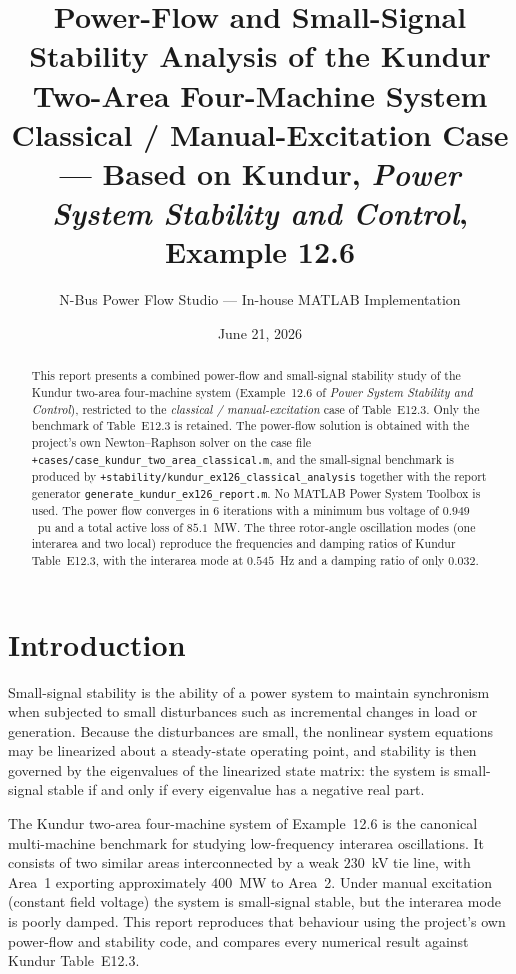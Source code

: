 \documentclass[12pt,a4paper]{article}
\title{\textbf{Power-Flow and Small-Signal Stability Analysis of the
Kundur Two-Area Four-Machine System}\\
\large Classical / Manual-Excitation Case --- Based on Kundur,
\textit{Power System Stability and Control}, Example 12.6}
\author{N-Bus Power Flow Studio --- In-house MATLAB Implementation}
\date{June 21, 2026}
\begin{document}
\maketitle
\thispagestyle{empty}

\begin{abstract}
This report presents a combined power-flow and small-signal stability study of
the Kundur two-area four-machine system (Example~12.6 of
\textit{Power System Stability and Control}), restricted to the
\emph{classical / manual-excitation} case of Table~E12.3. Only the
benchmark of Table~E12.3 is retained. The power-flow solution is obtained with
the project's own Newton--Raphson solver on the case file
\texttt{+cases/case\_kundur\_two\_area\_classical.m}, and the small-signal
benchmark is produced by \texttt{+stability/kundur\_ex126\_classical\_analysis}
together with the report generator \texttt{generate\_kundur\_ex126\_report.m}.
No MATLAB Power System Toolbox is used. The power flow converges in 6 iterations
with a minimum bus voltage of $0.949$~pu and a total active loss of $85.1$~MW.
The three rotor-angle oscillation modes (one interarea and two local) reproduce
the frequencies and damping ratios of Kundur Table~E12.3, with the interarea
mode at $0.545$~Hz and a damping ratio of only $0.032$.
\end{abstract}

\newpage
\tableofcontents
\newpage

\section{Introduction}

Small-signal stability is the ability of a power system to maintain synchronism
when subjected to small disturbances such as incremental changes in load or
generation. Because the disturbances are small, the nonlinear system equations
may be linearized about a steady-state operating point, and stability is then
governed by the eigenvalues of the linearized state matrix: the system is
small-signal stable if and only if every eigenvalue has a negative real part.

The Kundur two-area four-machine system of Example~12.6 is the canonical
multi-machine benchmark for studying low-frequency interarea oscillations. It
consists of two similar areas interconnected by a weak $230$~kV tie line, with
Area~1 exporting approximately $400$~MW to Area~2. Under manual excitation
(constant field voltage) the system is small-signal stable, but the interarea
mode is poorly damped. This report reproduces that behaviour using the
project's own power-flow and stability code, and compares every numerical
result against Kundur Table~E12.3.
\end{document}
